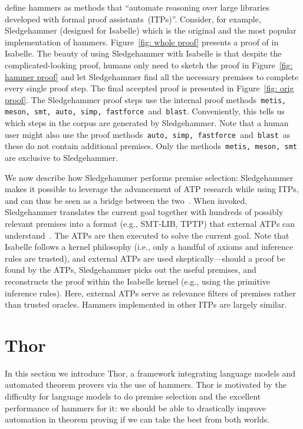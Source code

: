 \documentclass{article}
\begin{document}
\citet{blanchette2016hammering} define hammers as methods that ``automate reasoning over large libraries developed with formal proof assistants~(ITPs)''. Consider, for example, Sledgehammer (designed for Isabelle) which is the original and the most popular implementation of hammers.
Figure~\ref{fig: whole proof} presents a proof of  in Isabelle. The beauty of using Sledgehammer with Isabelle is that despite the complicated-looking proof, humans only need to sketch the proof in Figure~\ref{fig: hammer proof} and let Sledgehammer find all the necessary premises to complete every single proof step. The final accepted proof is presented in Figure~\ref{fig: orig proof}. The Sledgehammer proof steps use the internal proof methods\texttt{ metis, meson, smt, auto, simp, fastforce }and\texttt{ blast}. Conveniently, this tells us which steps in the corpus are generated by Sledgehammer. 
Note that a human user might also use the proof methods\texttt{ auto, simp, fastforce }and\texttt{ blast }as these do not contain additional premises. Only the methods\texttt{ metis, meson, smt} are exclusive to Sledgehammer.


We now describe how Sledgehammer performs premise selection: Sledgehammer makes it possible to leverage the advancement of ATP research while using ITPs, and can thus be seen as a bridge between the two~\citep{paulson2010three}. When invoked, Sledgehammer translates the current goal together with hundreds of possibly relevant premises into a format (e.g., SMT-LIB, TPTP) that external ATPs can understand~\citep{meng2008translating}. The ATPs are then executed to solve the current goal. Note that Isabelle follows a kernel philosophy (i.e., only a handful of axioms and inference rules are trusted), and external ATPs are used skeptically---should a proof be found by the ATPs, Sledgehammer picks out the useful premises, and reconstructs the proof within the Isabelle kernel (e.g., using the primitive inference rules). 
Here, external ATPs serve as relevance filters of premises rather than trusted oracles. Hammers implemented in other ITPs are largely similar.







 \section{Thor}
\label{sec: thor}
In this section we introduce Thor, a framework integrating language models and automated theorem provers via the use of hammers. Thor is motivated by the difficulty for language models to do premise selection and the excellent performance of hammers for it: we should be able to drastically improve automation in theorem proving if we can take the best from both worlds. 
\end{document}
